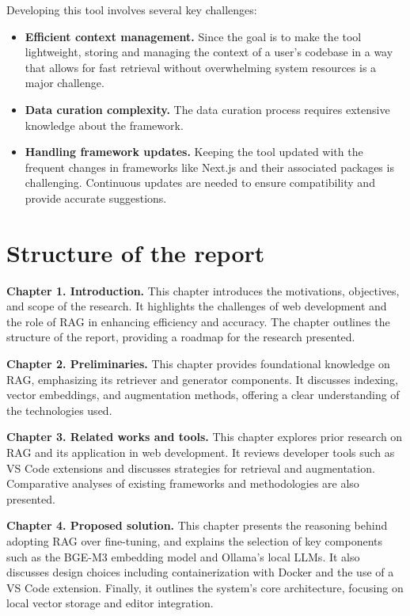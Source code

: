 Developing this tool involves several key challenges:

\begin{itemize}
	\item \textbf{Efficient context management.} Since the goal is to make the tool lightweight, storing and managing the context of a user's codebase in a way that allows for fast retrieval without overwhelming system resources is a major challenge.
	\item \textbf{Data curation complexity.} The data curation process requires extensive knowledge about the framework.
	\item \textbf{Handling framework updates.} Keeping the tool updated with the frequent changes in frameworks like Next.js and their associated packages is challenging. Continuous updates are needed to ensure compatibility and provide accurate suggestions.
\end{itemize}

\section{Structure of the report}

\textbf{Chapter 1. Introduction.} 
This chapter introduces the motivations, objectives, and scope of the research. It highlights the challenges of web development and the role of RAG in enhancing efficiency and accuracy. The chapter outlines the structure of the report, providing a roadmap for the research presented.

\textbf{Chapter 2. Preliminaries.} 
This chapter provides foundational knowledge on RAG, emphasizing its retriever and generator components. It discusses indexing, vector embeddings, and augmentation methods, offering a clear understanding of the technologies used.

\textbf{Chapter 3. Related works and tools.} 
This chapter explores prior research on RAG and its application in web development. It reviews developer tools such as VS Code extensions and discusses strategies for retrieval and augmentation. Comparative analyses of existing frameworks and methodologies are also presented.

\textbf{Chapter 4. Proposed solution.} 
This chapter presents the reasoning behind adopting RAG over fine-tuning, and explains the selection of key components such as the BGE-M3 embedding model and Ollama's local LLMs. It also discusses design choices including containerization with Docker and the use of a VS Code extension. Finally, it outlines the system’s core architecture, focusing on local vector storage and editor integration.


